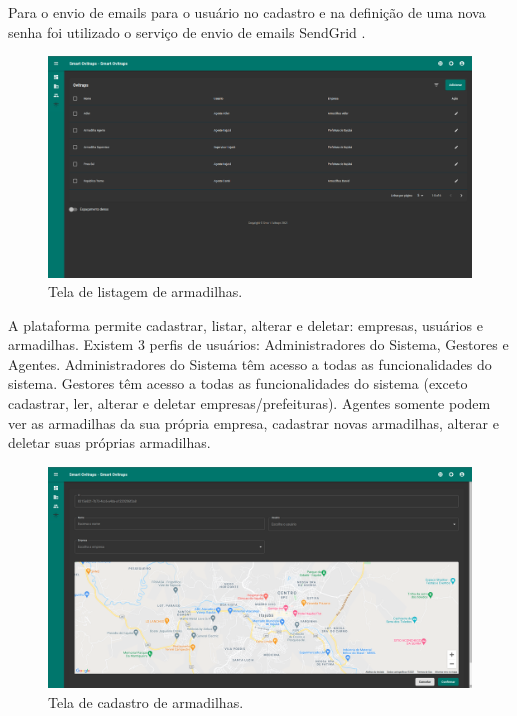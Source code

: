 \documentclass[
	12pt,				%
	openright,			%
	oneside,			%
	a4paper,			%
	chapter=TITLE,		%
	english,			%
	brazil				%
	]{abntex2}
\begin{document}
Para o envio de emails para o usuário no cadastro e na definição de uma nova senha foi utilizado o serviço de envio de emails SendGrid \cite{SendGrid}.

\begin{figure}[H]
    \centering
    \includegraphics[scale=0.20]{imagens/front_4.png}
    \caption{Tela de listagem de armadilhas.}
        \label{fig:listagem}
    \end{figure}

A plataforma permite cadastrar, listar, alterar e deletar: empresas, usuários e armadilhas. 
Existem 3 perfis de usuários: Administradores do Sistema, Gestores e Agentes. 
Administradores do Sistema têm acesso a todas as funcionalidades do sistema.
Gestores têm acesso a todas as funcionalidades do sistema (exceto cadastrar, ler, alterar e deletar empresas/prefeituras).
Agentes somente podem ver as armadilhas da sua própria empresa, cadastrar novas armadilhas, alterar e deletar
suas próprias armadilhas.

\begin{figure}[H]
    \centering
    \includegraphics[scale=0.20]{imagens/front_3.png}
    \caption{Tela de cadastro de armadilhas.}
        \label{fig:cadastro}
    \end{figure}
\end{document}
